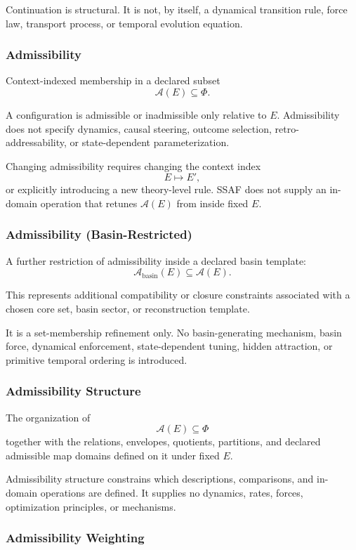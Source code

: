 \documentclass[aps,prx,onecolumn,11pt]{revtex4-2}
\theoremstyle{plain}
\theoremstyle{definition}
\theoremstyle{remark}
\begin{document}
Continuation is structural. It is not, by itself, a dynamical transition
rule, force law, transport process, or temporal evolution equation.

\subsubsection*{Admissibility}

Context-indexed membership in a declared subset
\[
\mathcal A(E)\subseteq\Phi.
\]

A configuration is admissible or inadmissible only relative to \(E\).
Admissibility does not specify dynamics, causal steering, outcome
selection, retro-addressability, or state-dependent parameterization.

Changing admissibility requires changing the context index
\[
E\mapsto E',
\]
or explicitly introducing a new theory-level rule. SSAF does not supply
an in-domain operation that retunes \(\mathcal A(E)\) from inside fixed
\(E\).

\subsubsection*{Admissibility (Basin-Restricted)}

A further restriction of admissibility inside a declared basin template:
\[
\mathcal A_{\mathrm{basin}}(E)\subseteq\mathcal A(E).
\]

This represents additional compatibility or closure constraints
associated with a chosen core set, basin sector, or reconstruction
template.

It is a set-membership refinement only. No basin-generating mechanism,
basin force, dynamical enforcement, state-dependent tuning, hidden
attraction, or primitive temporal ordering is introduced.

\subsubsection*{Admissibility Structure}

The organization of
\[
\mathcal A(E)\subseteq\Phi
\]
together with the relations, envelopes, quotients, partitions, and
declared admissible map domains defined on it under fixed \(E\).

Admissibility structure constrains which descriptions, comparisons, and
in-domain operations are defined. It supplies no dynamics, rates,
forces, optimization principles, or mechanisms.

\subsubsection*{Admissibility Weighting}
\end{document}
